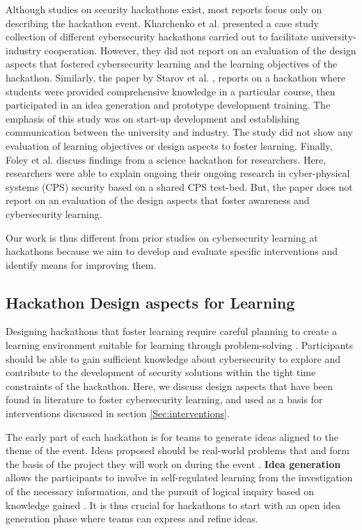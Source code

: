 \documentclass[runningheads]{llncs}
\begin{document}
Although studies on security hackathons exist, most reports focus only on describing the hackathon event.
Kharchenko et al. \cite{kharchenko2016university} presented a case study collection of different cybersecurity hackathons carried out to facilitate university-industry cooperation. 
However, they did not report on an evaluation of the design aspects that fostered cybersecurity learning and the learning objectives of the hackathon. Similarly, the paper by Starov et al. \cite{starov2015hacking}, reports on a hackathon where students were provided comprehensive knowledge in a particular course, then participated in an idea generation and prototype development training.
The emphasis of this study was on start-up development and establishing communication between the university and industry. The study did not show any evaluation of learning objectives or design aspects to foster learning. Finally, Foley et al. \cite{foley2018science} discuss findings from a science hackathon for researchers. Here, researchers were able to explain ongoing their ongoing research in cyber-physical systems (CPS) security based on a shared CPS test-bed.
But, the paper does not report on an evaluation of the design aspects that foster awareness and cybersecurity learning.

Our work is thus different from prior studies on cybersecurity learning at hackathons because we aim to develop and evaluate specific interventions and identify means for improving them.

\subsection{Hackathon Design aspects for Learning}\label{Sec:designaspects}
Designing hackathons that foster learning require careful planning to create a learning environment suitable for learning through problem-solving \cite{case2004between}. Participants should be able to gain sufficient knowledge about cybersecurity to explore and contribute to the development of security solutions within the tight time constraints of the hackathon\cite{kollwitz2019hack}.
Here, we discuss design aspects that have been found in literature to foster cybersecurity learning, and used as a basis for interventions discussed in section \ref{Sec:interventions}.

The early part of each hackathon is for teams to generate ideas aligned to the theme of the event. 
Ideas proposed should be real-world problems that and form the basis of the project they will work on during the event \cite{stoyanov2007effect}. \textbf{Idea generation} allows the participants to involve in self-regulated learning from the investigation of the necessary information, and the pursuit of logical inquiry based on knowledge gained \cite{akcay2009problem}. 
It is thus crucial for hackathons to start with an open idea generation phase \cite{bohmer2015open} where teams can express and refine ideas. 
\end{document}
